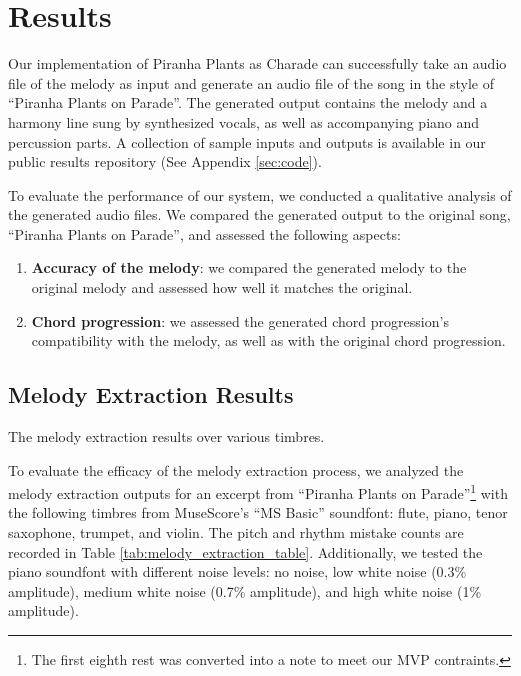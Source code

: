 \section{Results}
\label{sec:results}

Our implementation of Piranha Plants as Charade can successfully take an audio file of the melody as input and generate an audio file of the song in the style of ``Piranha Plants on Parade''. The generated output contains the melody and a harmony line sung by synthesized vocals, as well as accompanying piano and percussion parts. A collection of sample inputs and outputs is available in our public results repository (See Appendix \ref{sec:code}).

To evaluate the performance of our system, we conducted a qualitative analysis of the generated audio files. We compared the generated output to the original song, ``Piranha Plants on Parade'', and assessed the following aspects:
\begin{enumerate}
    \item \textbf{Accuracy of the melody}: we compared the generated melody to the original melody and assessed how well it matches the original.
    \item \textbf{Chord progression}: we assessed the generated chord progression's compatibility with the melody, as well as with the original chord progression.
\end{enumerate}

\subsection{Melody Extraction Results}
\label{sec:melody_extraction_results}

\begin{table} %
	\caption{The melody extraction results over various timbres.}
	\centering
	
	\label{tab:melody_extraction_table}
\end{table}
To evaluate the efficacy of the melody extraction process, we analyzed the melody extraction outputs for an excerpt from ``Piranha Plants on Parade''\footnote{The first eighth rest was converted into a note to meet our MVP contraints.} with the following timbres from MuseScore's ``MS Basic'' soundfont: flute, piano, tenor saxophone, trumpet, and violin. The pitch and rhythm mistake counts are recorded in Table \ref{tab:melody_extraction_table}. Additionally, we tested the piano soundfont with different noise levels: no noise, low white noise (0.3\% amplitude), medium white noise (0.7\% amplitude), and high white noise (1\% amplitude).

